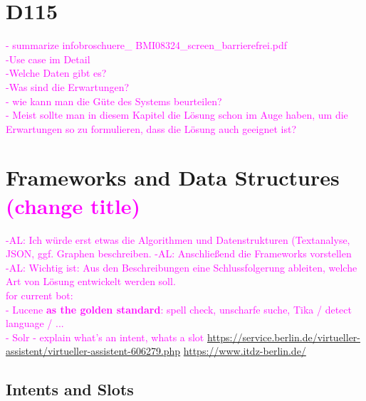 \section{D115}
\textcolor{magenta}{
	- summarize infobroschuere\_ BMI08324\_screen\_barrierefrei.pdf\\
	-Use case im Detail\\
	-Welche Daten gibt es?\\	  
	-Was sind die Erwartungen?\\ 	
	- wie kann man die G\"ute des Systems beurteilen?\\   
	- Meist sollte man in diesem Kapitel die L\"osung schon im Auge haben, um die Erwartungen so zu formulieren, dass die L\"osung auch geeignet ist?\\ 
}


\section{Frameworks and Data Structures \textcolor{magenta}{(change title)}}

\textcolor{magenta}{-AL: Ich w\"urde erst etwas die Algorithmen und Datenstrukturen (Textanalyse, JSON, ggf. Graphen beschreiben. 
	-AL: Anschlie{\ss}end die Frameworks vorstellen\\ 
	-AL: Wichtig ist: Aus den Beschreibungen eine Schlussfolgerung ableiten, welche Art von L\"osung entwickelt werden soll.\\
for current bot: \\
- Lucene \textbf{as the golden standard}: spell check, unscharfe suche, Tika / detect language / ... \\
- Solr
- explain what's an intent, whats a slot
\url{https://service.berlin.de/virtueller-assistent/virtueller-assistent-606279.php}
\url{https://www.itdz-berlin.de/}
}


\subsection{Intents and Slots} 

